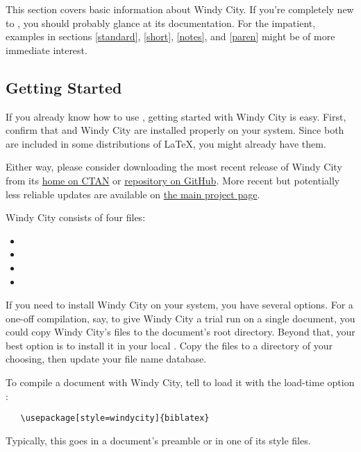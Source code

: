 \documentclass[11pt,letterpaper,oneside]{article}
\begin{document}
This section covers basic information about Windy City. If you're
completely new to \biblatex, you should probably glance at its
documentation. For the impatient, examples in sections \ref{standard},
\ref{short}, \ref{notes}, and \ref{paren} might be of more immediate
interest.

\subsection{Getting Started}

If you already know how to use \biblatex, getting started with Windy
City is easy. First, confirm that \biblatex and Windy City are
installed properly on your system. Since both are included in some
distributions of \LaTeX, you might already have them.

Either way, please consider downloading the most recent release of
Windy City from its
\begingroup\hypersetup{urlcolor=blue}\href{https://www.ctan.org/pkg/windycity}{home
on CTAN} or
\href{https://github.com/brianchase/windycity/releases}{repository on
GitHub}. More recent but potentially less reliable updates are
available on \href{https://github.com/brianchase/windycity}{the main
project page}.\endgroup

Windy City consists of four files:

\begin{itemize}[before=\small]
\item {}
\item {}
\item {}
\item {}
\end{itemize}

If you need to install Windy City on your system, you have several
options. For a one-off compilation, say, to give Windy City a trial
run on a single document, you could copy Windy City's files to the
document's root directory. Beyond that, your best option is to install
it in your local . Copy the files to a directory of your
choosing, then update your  file name database.

To compile a document with Windy City, tell \biblatex to load it with
the load-time option :

\begin{verbatim}
   \usepackage[style=windycity]{biblatex}
\end{verbatim}

\noindent Typically, this goes in a document's preamble or in one of
its style files.
\end{document}
